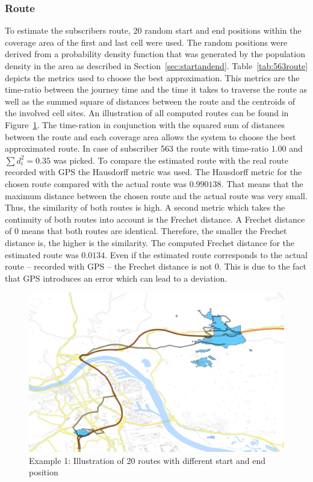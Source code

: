 \documentclass[master,english]{hgbthesis}
\begin{document}
\subsubsection{Route}
To estimate the subscribers route, 20 random start and end positions within the coverage area of the first and last cell were used. The random positions were derived from a probability density function that was generated by the population density in the area as described in Section~\ref{sec:startandend}. Table~\ref{tab:563route} depicts the metrics used to choose the best approximation. This metrics are the time-ratio between the journey time and the time it takes to traverse the route as well as the summed square of distances between the route and the centroids of the involved cell sites. An illustration of all computed routes can be found in Figure~\ref{fig:563_routes}. The time-ration in conjunction with the squared sum of distances between the route and each coverage area allows the system to choose the best approximated route. In case of subscriber 563 the route with time-ratio $1.00$ and $\sum {d}_{i}^{2}=0.35$ was picked. To compare the estimated route with the real route recorded with GPS the Hausdorff metric was used. The Hausdorff metric for the chosen route  compared with the actual route was $0.990138 $. That means that the maximum distance between the chosen route and the actual route was very small. Thus, the similarity of  both routes is high. A second metric which takes the continuity of both routes into account is the Frechet distance. A Frechet distance of $0$ means that both routes are identical. Therefore, the smaller the Frechet distance is, the higher is the similarity. The computed Frechet distance for the estimated route was $0.0134$. Even if the estimated route corresponds to the actual route -- recorded with GPS -- the Frechet distance is not $0$. This is due to the fact that GPS introduces an error which can lead to a deviation.
\begin{figure}
\centering
\includegraphics[width=0.7\linewidth]{./images/563_routes}
\caption{Example 1: Illustration of 20 routes with different start and end position}
\label{fig:563_routes}
\end{figure}
\end{document}
